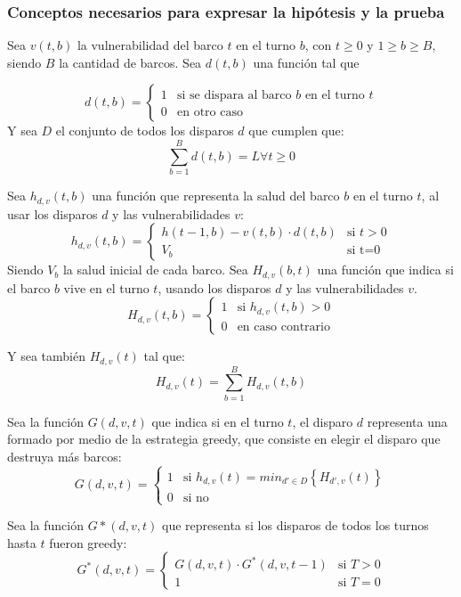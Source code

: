 \documentclass{article}
\begin{document}
\subsubsection{Conceptos necesarios para expresar la hipótesis y la prueba}

Sea $v(t,b)$ la vulnerabilidad del barco $t$ en el turno $b$, con $t\geq0$ y $1\geq b \geq B$, siendo $B$ la cantidad de barcos.
Sea $d(t,b)$ una función tal que

\[
    d(t,b)=
    \begin{cases}
        1 & \text{si se dispara al barco $b$ en el turno $t$} \\
        0 & \text{en otro caso}
    \end{cases}
\]
Y sea $D$ el conjunto de todos los disparos $d$ que cumplen que:
$$ \sum_{b=1}^{B} d(t,b) = L  \forall t \geq 0 $$

Sea $h_{d,v} (t,b)$ una función que representa la salud del barco $b$ en el turno $t$, al usar los disparos $d$ y las vulnerabilidades $v$:
\[
    h_{d,v}(t,b)=
    \begin{cases}
        h(t-1,b)-v(t,b) \cdot d(t,b) & \text{si $t>0$} \\
        V_b & \text{si t=0}
    \end{cases}
\]
Siendo $V_b$ la salud inicial de cada barco. Sea $H_{d,v}(b,t)$ una función que indica si el barco $b$ vive en el turno $t$, usando los disparos $d$ y las vulnerabilidades $v$.
\[
    H_{d,v}(t,b)=
    \begin{cases}
        1 & \text{si $h_{d,v}(t,b)>0$} \\
        0 & \text{en caso contrario}
    \end{cases}
\]

Y sea también $H_{d,v}(t)$ tal que: $$H_{d,v}(t)=\sum_{b=1}^{B} H_{d,v}(t,b)$$

Sea la función $G(d,v,t)$ que indica si en el turno $t$, el disparo $d$ representa una formado por medio de la estrategia greedy, que consiste en elegir el disparo que destruya más barcos:
\[
    G(d,v,t)=
    \begin{cases}
        1 & \text{si $h_{d,v}(t)=min_{d' \in D} \left \{ H_{d',v}(t) \right \} $} \\
        0 & \text{si no}
    \end{cases}
\]

Sea la función $G*(d,v,t)$ que representa si los disparos de todos los turnos hasta $t$ fueron greedy:
\[
    G^*(d,v,t)=
    \begin{cases}
        G(d,v,t) \cdot G^*(d,v,t-1) & \text{si $T>0$} \\
        1 & \text{si $T=0$}
    \end{cases}
\]
\end{document}
